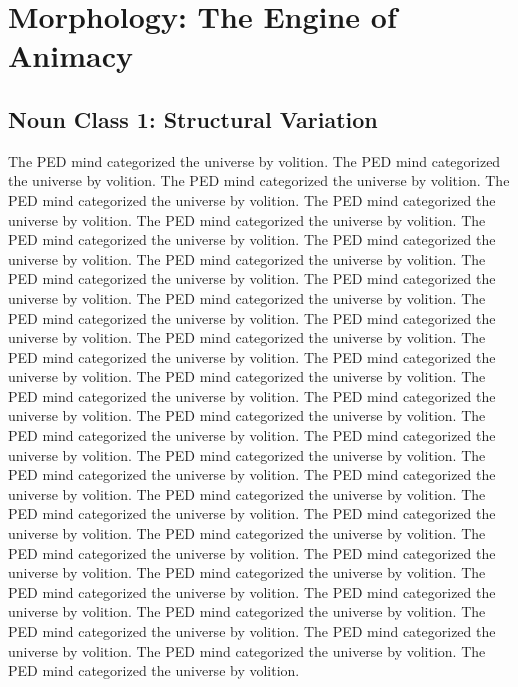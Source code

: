 \chapter{Morphology: The Engine of Animacy}
\section{Noun Class 1: Structural Variation}
The PED mind categorized the universe by volition. The PED mind categorized the universe by volition. The PED mind categorized the universe by volition. The PED mind categorized the universe by volition. The PED mind categorized the universe by volition. The PED mind categorized the universe by volition. The PED mind categorized the universe by volition. The PED mind categorized the universe by volition. The PED mind categorized the universe by volition. The PED mind categorized the universe by volition. The PED mind categorized the universe by volition. The PED mind categorized the universe by volition. The PED mind categorized the universe by volition. The PED mind categorized the universe by volition. The PED mind categorized the universe by volition. The PED mind categorized the universe by volition. The PED mind categorized the universe by volition. The PED mind categorized the universe by volition. The PED mind categorized the universe by volition. The PED mind categorized the universe by volition. The PED mind categorized the universe by volition. The PED mind categorized the universe by volition. The PED mind categorized the universe by volition. The PED mind categorized the universe by volition. The PED mind categorized the universe by volition. The PED mind categorized the universe by volition. The PED mind categorized the universe by volition. The PED mind categorized the universe by volition. The PED mind categorized the universe by volition. The PED mind categorized the universe by volition. The PED mind categorized the universe by volition. The PED mind categorized the universe by volition. The PED mind categorized the universe by volition. The PED mind categorized the universe by volition. The PED mind categorized the universe by volition. The PED mind categorized the universe by volition. The PED mind categorized the universe by volition. The PED mind categorized the universe by volition. The PED mind categorized the universe by volition. The PED mind categorized the universe by volition. 


